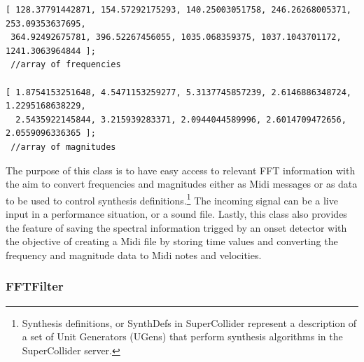 \begin{verbatim}
[ 128.37791442871, 154.57292175293, 140.25003051758, 246.26268005371, 253.09353637695,
 364.92492675781, 396.52267456055, 1035.068359375, 1037.1043701172, 1241.3063964844 ]; 
 //array of frequencies

[ 1.8754153251648, 4.5471153259277, 5.3137745857239, 2.6146886348724, 1.2295168638229,
  2.5435922145844, 3.215939283371, 2.0944044589996, 2.6014709472656, 2.0559096336365 ]; 
 //array of magnitudes
\end{verbatim}
The purpose of this class is to have easy access to relevant FFT information with the aim to convert frequencies and magnitudes either as Midi messages or as data to be used to control synthesis definitions.\footnote{Synthesis definitions, or SynthDefs in SuperCollider represent a description of a set of Unit Generators (UGens) that perform synthesis algorithms in the SuperCollider server.} The incoming signal can be a live input in a performance situation, or a sound file. Lastly, this class also provides the feature of saving the spectral information trigged by an onset detector with the objective of  creating a Midi file by storing time values and converting the frequency and magnitude data to Midi notes and velocities.

\subsubsection{FFTFilter}
\hypertarget{fftfilter}{}

